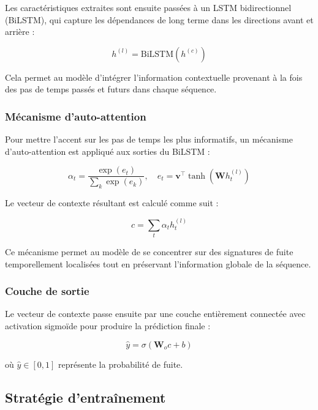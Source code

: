 Les caractéristiques extraites sont ensuite passées à un LSTM bidirectionnel
(BiLSTM), qui capture les dépendances de long terme dans les directions avant
et arrière :

\begin{equation}
h^{(l)} = \text{BiLSTM}(h^{(c)})
\end{equation}

Cela permet au modèle d'intégrer l'information contextuelle provenant à la fois
des pas de temps passés et futurs dans chaque séquence.

\subsubsection{Mécanisme d'auto-attention}

Pour mettre l'accent sur les pas de temps les plus informatifs, un mécanisme
d'auto-attention est appliqué aux sorties du BiLSTM :

\begin{equation}
\alpha_t = \frac{\exp(e_t)}{\sum_{k} \exp(e_k)}, \quad
e_t = \mathbf{v}^\top \tanh(\mathbf{W} h^{(l)}_t)
\end{equation}

Le vecteur de contexte résultant est calculé comme suit :

\begin{equation}
c = \sum_t \alpha_t h^{(l)}_t
\end{equation}

Ce mécanisme permet au modèle de se concentrer sur des signatures de fuite
temporellement localisées tout en préservant l'information globale de la séquence.

\subsubsection{Couche de sortie}

Le vecteur de contexte passe ensuite par une couche entièrement connectée avec
activation sigmoïde pour produire la prédiction finale :

\begin{equation}
\hat{y} = \sigma(\mathbf{W}_o c + b)
\end{equation}

où $\hat{y} \in [0,1]$ représente la probabilité de fuite.

\subsection{Stratégie d'entraînement}

